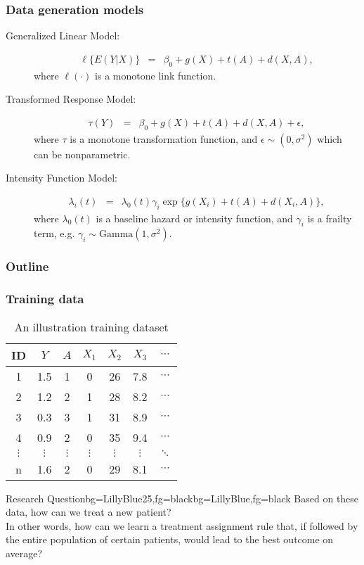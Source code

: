 \documentclass{beamer}
\begin{document}
\begin{frame}
\frametitle{Data generation models}

\begin{description}
	\item[Generalized Linear Model:] 
\begin{eqnarray*}
	\ell\{E(Y|X)\} &=& \beta_0 + g(X) + t(A) + d(X,A),
\end{eqnarray*}
where $\ell(\cdot)$ is a monotone link function. 
\item[Transformed Response Model:] 
\begin{eqnarray*}
	\tau(Y) &=& \beta_0 + g(X) + t(A) + d(X,A)+\epsilon,
\end{eqnarray*}
where $\tau$ is a monotone transformation function, and $\epsilon \sim (0,\sigma^2)$ which can be nonparametric.
\item[Intensity Function Model:] 
\begin{eqnarray*}
	\lambda_i(t) &=& \lambda_0(t)\gamma_i \exp\{g(X_i)+ t(A)+d(X_i,A)\},
\end{eqnarray*}
where $\lambda_0(t)$ is a baseline hazard or intensity function, and $\gamma_i$ is a frailty term, e.g. $\gamma_i \sim \mbox{Gamma}(1,\sigma^2)$. 
\end{description}	
	
\end{frame}	

\begin{frame}
	\frametitle{Outline}
	\tableofcontents[current]
\end{frame}

\begin{frame}
	\frametitle{Training data}
	\begin{table}[htbp]
		\centering
		\caption{An illustration training dataset}
		\begin{tabular}{c|c|c|cccc}
			\hline
			\hline
		   ID & $Y$     & $A$   & $X_1$    & $X_2$    & $X_3$    & $\cdots$ \\
		\hline
		1&1.5  & 1     & 0     & 26    & 7.8   & $\cdots$ \\
		2&1.2  & 2     & 1     & 28    & 8.2   & $\cdots$  \\
		3&0.3  & 3     & 1     & 31    & 8.9   & $\cdots$  \\
		4&0.9  & 2     & 0     & 35    & 9.4   & $\cdots$  \\
		$\vdots$ & $\vdots$    & $\vdots$    & $\vdots$   & $\vdots$     & $\vdots$     & $\ddots$  \\
		n & 1.6 & 2 & 0 & 29 & 8.1 & $\cdots$ \\
			\hline
			\hline
		\end{tabular}%
		\label{tab:ITRDataProblem}%
	\end{table}%
	\begin{variableblock}{Research Question}{bg=LillyBlue25,fg=black}{bg=LillyBlue,fg=black}
		Based on these data, how can we treat a new patient?  \\
		In other words, how can we learn a treatment assignment rule that, if followed by the entire population of certain patients, would lead to the best outcome on average?
	\end{variableblock}
\end{frame}
\end{document}
